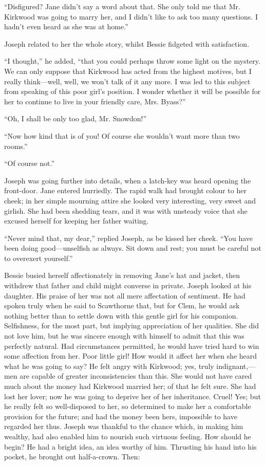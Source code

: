 ``Disfigured? Jane didn't say a word about that. She only told me that
Mr. Kirkwood was going to marry her, and I didn't like to ask too many
questions. I hadn't even heard as she was at home.''

Joseph related to her the whole story, whilst Bessie fidgeted with
satisfaction.

``I thought,'' he added, ``that you could {}perhaps throw some light on
the mystery. We can only suppose that Kirkwood has acted from the
highest motives, but I really think---well, well, we won't talk of it
any more. I was led to this subject from speaking of this poor girl's
position. I wonder whether it will be possible for her to continue to
live in your friendly care, Mrs. Byass?''

``Oh, I shall be only too glad, Mr. Snowdon!''

``Now how kind that is of you! Of course she wouldn't want more than two
rooms.''

``Of course not.''

Joseph was going further into details, when a latch-key was heard
opening the front-door. Jane entered hurriedly. The rapid walk had
brought colour to her cheek; in her simple mourning attire she looked
very interesting, very sweet and girlish. She had been shedding tears,
and it was with unsteady voice that she excused herself for keeping her
father waiting.

``Never mind that, my dear,'' replied Joseph, as be kissed her cheek.
``You have been doing good---unselfish as always. Sit down and rest; you
must be careful not to overexert yourself.''

{}Bessie busied herself affectionately in removing Jane's hat and
jacket, then withdrew that father and child might converse in private.
Joseph looked at his daughter. His praise of her was not all mere
affectation of sentiment. He had spoken truly when he said to Scawthorne
that, but for Clem, he would ask nothing better than to settle down with
this gentle girl for his companion. Selfishness, for the most part, but
implying appreciation of her qualities. She did not love him, but he was
sincere enough with himself to admit that this was perfectly natural.
Had circumstances permitted, he would have tried hard to win some
affection from her. Poor little girl! How would it affect her when she
heard what he was going to say? He felt angry with Kirkwood; yes, truly
indignant,---men are capable of greater inconsistencies than this. She
would not have cared much about the money had Kirkwood married her; of
that he felt sure. She had lost her lover; now he was going to deprive
her of her inheritance. Cruel! Yes; but he really felt so well-disposed
to her, so determined to make her a comfortable provision for the
future; and had the {}money been hers, impossible to have regarded her
thus. Joseph was thankful to the chance which, in making him wealthy,
had also enabled him to nourish such virtuous feeling. How should he
begin? He had a bright idea, an idea worthy of him. Thrusting his hand
into his pocket, he brought out half-a-crown. Then:

